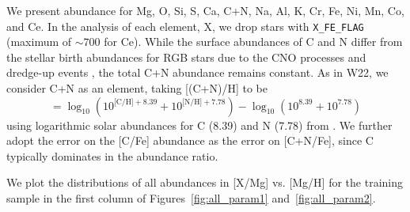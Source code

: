 \documentclass[modern]{aastex631}
\begin{document}
We present abundance for Mg, O, Si, S, Ca, C+N, Na, Al, K, Cr, Fe, Ni, Mn, Co, and Ce. In the analysis of each element, X, we drop stars with \texttt{X\_FE\_FLAG} (maximum of $\sim 700$ for Ce). While the surface abundances of C and N differ from the stellar birth abundances for RGB stars due to the CNO processes and dredge-up events \citep{iben1965, shetrone2019}, the total C+N abundance remains constant. As in W22, we consider C+N as an element, taking [(C+N)/H] to be 
\begin{equation}
    [\text{C+N}/\text{H}] = \log_{10}(10^{\text{[C/H]}+8.39} + 10^{\text{[N/H]}+7.78}) - \log_{10}(10^{8.39} + 10^{7.78})
\end{equation}
using logarithmic solar abundances for C (8.39) and N (7.78) from \citet{grevesse2007}. We further adopt the error on the [C/Fe] abundance as the error on [C+N/Fe], since C typically dominates in the abundance ratio.

We plot the distributions of all abundances in [X/Mg] vs. [Mg/H] for the training sample in the first column of Figures~\ref{fig:all_param1} and~\ref{fig:all_param2}. 
\end{document}
